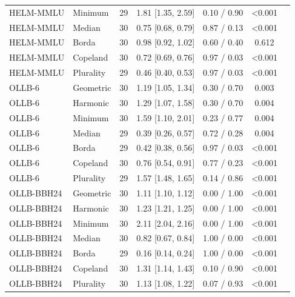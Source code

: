 \begin{tabular}{llrcccc}
HELM-MMLU & Minimum & 29 & 1.81 [1.35, 2.59] & 0.10 / 0.90 & <0.001\\
HELM-MMLU & Median & 30 & 0.75 [0.68, 0.79] & 0.87 / 0.13 & <0.001\\
HELM-MMLU & Borda & 30 & 0.98 [0.92, 1.02] & 0.60 / 0.40 & 0.612\\
HELM-MMLU & Copeland & 30 & 0.72 [0.69, 0.76] & 0.97 / 0.03 & <0.001\\
HELM-MMLU & Plurality & 29 & 0.46 [0.40, 0.53] & 0.97 / 0.03 & <0.001\\
OLLB-6 & Geometric & 30 & 1.19 [1.05, 1.34] & 0.30 / 0.70 & 0.003\\
OLLB-6 & Harmonic & 30 & 1.29 [1.07, 1.58] & 0.30 / 0.70 & 0.004\\
OLLB-6 & Minimum & 30 & 1.59 [1.10, 2.01] & 0.23 / 0.77 & 0.004\\
OLLB-6 & Median & 29 & 0.39 [0.26, 0.57] & 0.72 / 0.28 & 0.004\\
OLLB-6 & Borda & 29 & 0.42 [0.38, 0.56] & 0.97 / 0.03 & <0.001\\
OLLB-6 & Copeland & 30 & 0.76 [0.54, 0.91] & 0.77 / 0.23 & <0.001\\
OLLB-6 & Plurality & 29 & 1.57 [1.48, 1.65] & 0.14 / 0.86 & <0.001\\
OLLB-BBH24 & Geometric & 30 & 1.11 [1.10, 1.12] & 0.00 / 1.00 & <0.001\\
OLLB-BBH24 & Harmonic & 30 & 1.23 [1.21, 1.25] & 0.00 / 1.00 & <0.001\\
OLLB-BBH24 & Minimum & 30 & 2.11 [2.04, 2.16] & 0.00 / 1.00 & <0.001\\
OLLB-BBH24 & Median & 30 & 0.82 [0.67, 0.84] & 1.00 / 0.00 & <0.001\\
OLLB-BBH24 & Borda & 29 & 0.16 [0.14, 0.24] & 1.00 / 0.00 & <0.001\\
OLLB-BBH24 & Copeland & 30 & 1.31 [1.14, 1.43] & 0.10 / 0.90 & <0.001\\
OLLB-BBH24 & Plurality & 30 & 1.13 [1.08, 1.22] & 0.07 / 0.93 & <0.001\\
\midrule
\bottomrule\end{tabular}
